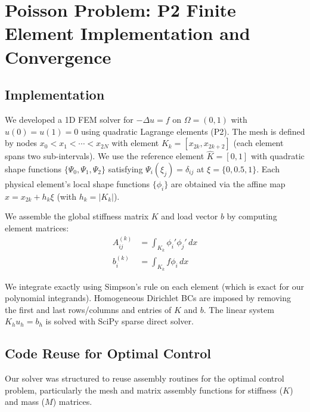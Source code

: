 \documentclass{article}
\begin{document}
\section{Poisson Problem: P2 Finite Element Implementation and Convergence}

\subsection{Implementation}
We developed a 1D FEM solver for $-\Delta u = f$ on $\Omega = (0,1)$ with $u(0)=u(1)=0$ using quadratic Lagrange elements (P2). The mesh is defined by nodes $x_0 < x_1 < \cdots < x_{2N}$ with element $K_k = [x_{2k}, x_{2k+2}]$ (each element spans two sub-intervals). We use the reference element $\hat K=[0,1]$ with quadratic shape functions $\{\Psi_0,\Psi_1,\Psi_2\}$ satisfying $\Psi_i(\xi_j)=\delta_{ij}$ at $\xi=\{0,0.5,1\}$. Each physical element's local shape functions $\{\phi_i\}$ are obtained via the affine map $x = x_{2k} + h_k\xi$ (with $h_k = |K_k|$).

We assemble the global stiffness matrix $K$ and load vector $b$ by computing element matrices:
\begin{align*}
A^{(k)}_{ij} &= \int_{K_k}\phi_{i}'\phi_{j}'\,dx \\
b^{(k)}_{i} &= \int_{K_k}f\phi_i\,dx
\end{align*}

We integrate exactly using Simpson's rule on each element (which is exact for our polynomial integrands). Homogeneous Dirichlet BCs are imposed by removing the first and last rows/columns and entries of $K$ and $b$. The linear system $K_{h}u_h = b_{h}$ is solved with SciPy sparse direct solver.

\subsection{Code Reuse for Optimal Control}
Our solver was structured to reuse assembly routines for the optimal control problem, particularly the mesh and matrix assembly functions for stiffness ($K$) and mass ($M$) matrices.
\end{document}
